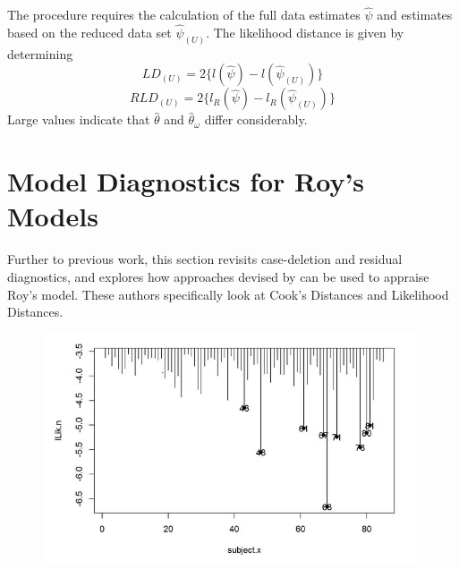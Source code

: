 \documentclass[12pt, a4paper]{report}
\theoremstyle{definition}
\theoremstyle{remark}
\begin{document}

The
procedure requires the calculation of the full data estimates
$\hat{\psi}$ and estimates based on the reduced data set
$\hat{\psi}_{(U)}$. The likelihood distance is given by
determining
\[
LD_{(U)} = 2\{l(\hat{\psi}) - l( \hat{\psi}_{(U)}) \}\]\[
RLD_{(U)} = 2\{l_{R}(\hat{\psi}) - l_{R}(\hat{\psi}_{(U)})\}
\]
Large values indicate that ${\hat{\theta}}$ and ${\hat{\theta}_\omega}$ differ considerably.





\section{Model Diagnostics for Roy's Models}

Further to previous work, this section revisits case-deletion and residual diagnostics, and explores how approaches devised by  \citet{Galecki} can be used to appraise Roy's model. These authors specifically look at Cook's Distances and Likelihood Distances.
%	





\begin{figure}[h!]
	\centering
	\includegraphics[width=0.7\linewidth]{images/LogLik-JS-Roy}
	\caption{}
	\label{fig:LogLik-JS-Roy}
\end{figure}
\end{document}
